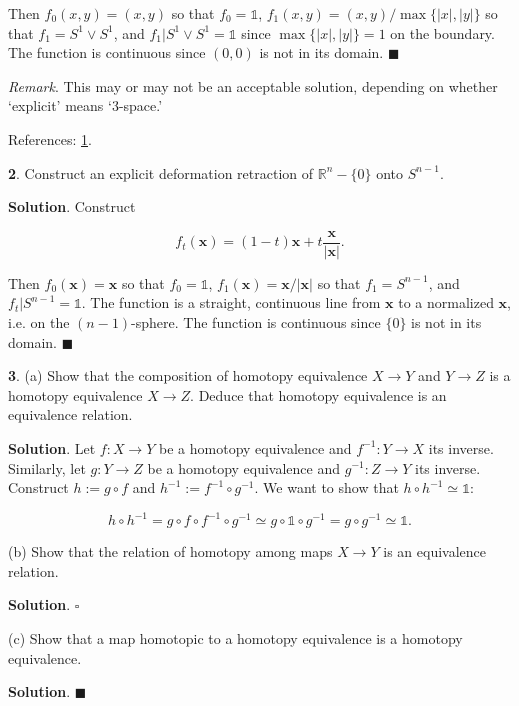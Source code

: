 \documentclass{article}
\newcommand{\R}{\mathbb{R}}
\newcommand{\identity}{\mathds{1}}
\begin{document}
Then $f_{0}(x, y) = (x, y)$ so that $f_{0} = \identity$, $f_{1}(x, y) = (x, y) / \max\{|x|, |y|\}$ so that $f_{1} = S^{1}\vee S^{1}$, and $f_{1}|S^{1}\vee S^{1} = \identity$ since $\max \{|x|, |y|\} = 1$ on the boundary. The function is continuous since $(0, 0)$ is not in its domain. $\blacksquare$
\medskip

\textit{Remark}. This may or may not be an acceptable solution, depending on whether `explicit' means `3-space.'
\medskip

References: \href{https://riemannianhunger.wordpress.com/solutions-to-algebraic-topology-by-allen-hatcher/hatcher-0-1/}{1}.
\bigskip
\bigskip

\textbf{2}. Construct an explicit deformation retraction of $\R^{n} - \{0\}$ onto $S^{n-1}$.
\medskip

\textbf{Solution}. Construct

$$f_{t}(\mathbf{x}) = (1-t)\mathbf{x} + t\frac{\mathbf{x}}{|\mathbf{x}|}.$$

Then $f_{0}(\mathbf{x}) = \mathbf{x}$ so that $f_{0} = \identity$, $f_{1}(\mathbf{x}) = \mathbf{x}/|\mathbf{x}|$ so that $f_{1} = S^{n-1}$, and $f_{t}|S^{n-1} = \identity$. The function is a straight, continuous line from $\mathbf{x}$ to a normalized $\mathbf{x}$, i.e. on the $(n-1)$-sphere. The function is continuous since $\{0\}$ is not in its domain. $\blacksquare$
\bigskip
\bigskip

\textbf{3}. (a) Show that the composition of homotopy equivalence $X\to Y$ and $Y\to Z$ is a homotopy equivalence $X\to Z$. Deduce that homotopy equivalence is an equivalence relation.
\medskip

\textbf{Solution}. Let $f:X\to Y$ be a homotopy equivalence and $f^{-1}:Y\to X$ its inverse. Similarly, let $g:Y\to Z$ be a homotopy equivalence and $g^{-1}:Z\to Y$ its inverse. Construct $h := g\circ f$ and $h^{-1} := f^{-1}\circ g^{-1}$. We want to show that $h\circ h^{-1}\simeq \identity$:

$$h\circ h^{-1} = g\circ f\circ f^{-1}\circ g^{-1}\simeq g\circ \identity\circ g^{-1} = g\circ g^{-1}\simeq \identity.$$

(b) Show that the relation of homotopy among maps $X\to Y$ is an equivalence relation.
\medskip

\textbf{Solution}. $\square$
\medskip

(c) Show that a map homotopic to a homotopy equivalence is a homotopy equivalence.
\medskip

\textbf{Solution}. $\blacksquare$
\bigskip
\bigskip
\end{document}
